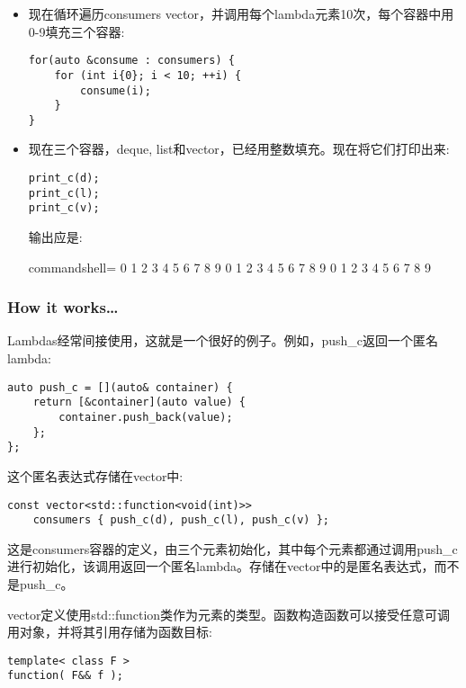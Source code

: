 \begin{itemize}
\item 
现在循环遍历consumers vector，并调用每个lambda元素10次，每个容器中用0-9填充三个容器:

\begin{lstlisting}[style=styleCXX]
for(auto &consume : consumers) {
	for (int i{0}; i < 10; ++i) {
		consume(i);
	}
}
\end{lstlisting}

\item 
现在三个容器，deque, list和vector，已经用整数填充。现在将它们打印出来:

\begin{lstlisting}[style=styleCXX]
print_c(d);
print_c(l);
print_c(v);
\end{lstlisting}

输出应是:

\begin{tcblisting}{commandshell={}}
0 1 2 3 4 5 6 7 8 9
0 1 2 3 4 5 6 7 8 9
0 1 2 3 4 5 6 7 8 9
\end{tcblisting}
\end{itemize}

\subsubsection{How it works…}

Lambdas经常间接使用，这就是一个很好的例子。例如，push\_c返回一个匿名lambda:

\begin{lstlisting}[style=styleCXX]
auto push_c = [](auto& container) {
	return [&container](auto value) {
		container.push_back(value);
	};
};
\end{lstlisting}

这个匿名表达式存储在vector中:

\begin{lstlisting}[style=styleCXX]
const vector<std::function<void(int)>>
	consumers { push_c(d), push_c(l), push_c(v) };
\end{lstlisting}

这是consumers容器的定义，由三个元素初始化，其中每个元素都通过调用push\_c进行初始化，该调用返回一个匿名lambda。存储在vector中的是匿名表达式，而不是push\_c。

vector定义使用std::function类作为元素的类型。函数构造函数可以接受任意可调用对象，并将其引用存储为函数目标:

\begin{lstlisting}[style=styleCXX]
template< class F >
function( F&& f );
\end{lstlisting}

